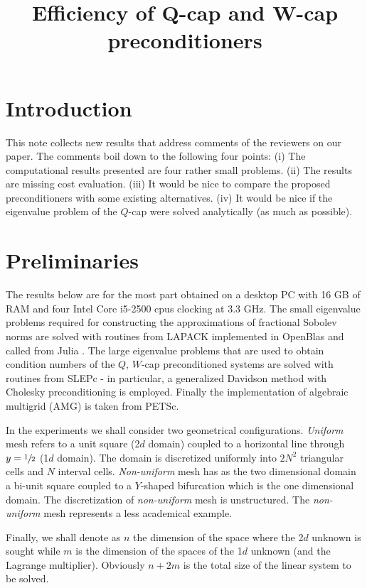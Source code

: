 \documentclass[10pt, a4paper]{article}
\title{Efficiency of Q-cap and W-cap preconditioners}
\begin{document}
\maketitle

\section*{Introduction}
This note collects new results that address comments of the reviewers on our paper. 
The comments boil down to the following four points: (i) The computational results 
presented are four rather small problems. (ii) The results are missing cost evaluation. 
(iii) It would be nice to compare the proposed preconditioners with some existing 
alternatives. (iv) It would be nice if the eigenvalue problem of the $Q$-cap were solved
analytically (as much as possible).

\section*{Preliminaries}
The results below are for the most part obtained on a desktop PC with 16 GB of RAM 
and four Intel Core i5-2500 cpus clocking at 3.3 GHz. The small eigenvalue problems 
required for constructing the approximations of fractional Sobolev norms are solved 
with routines from LAPACK\cite{lapack} implemented in OpenBlas\cite{openblas}
and called from Julia \cite{julia}. The large eigenvalue problems that are used to 
obtain condition numbers of the $Q$, $W$-cap preconditioned systems are solved with 
routines from SLEPc\cite{slepc} - in particular,
a generalized Davidson method with Cholesky preconditioning is employed. Finally the 
implementation of algebraic multigrid (AMG) is taken from PETSc\cite{petsc}.

In the experiments we shall consider two geometrical configurations. \textit{Uniform} 
mesh refers to a unit square (2$d$ domain) coupled to a horizontal line through 
$y=\sfrac{1}{2}$ (1$d$ domain). The domain is discretized uniformly into $2N^2$ 
triangular cells and $N$ interval cells. \textit{Non-uniform} mesh has as the two 
dimensional domain a bi-unit square coupled to a $Y$-shaped bifurcation which
is the one dimensional domain. The discretization of \textit{non-uniform} mesh is 
unstructured. The \textit{non-uniform} mesh represents a less academical example.

Finally, we shall denote as $n$ the dimension of the space where the 2$d$ unknown 
is sought while $m$ is the dimension of the spaces of the 1$d$ unknown (and the 
Lagrange multiplier). Obviously $n+2m$ is the total size of the linear system to 
be solved.
\end{document}
